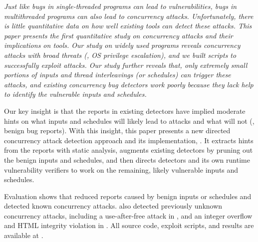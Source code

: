 \it Just like bugs in single-threaded programs can lead to vulnerabilities, 
bugs in multithreaded programs can also lead to concurrency attacks. 
Unfortunately, there is little quantitative data on how well existing tools 
can detect these attacks. This paper presents the first quantitative study 
on concurrency attacks and their implications on tools. Our study on 
\nprog widely used programs reveals \nattacks concurrency attacks with 
broad threats (\eg, OS privilege escalation), and we built scripts to 
successfully exploit \nreproduced attacks. Our study further reveals that, only 
extremely small portions of inputs and thread interleavings (or 
schedules) can trigger these attacks, and existing concurrency bug detectors 
work poorly because they lack help to identify the vulnerable inputs and 
schedules.



Our key insight is that the reports in existing detectors have implied 
moderate hints on what inputs and schedules will likely lead to attacks and 
what will not (\eg, benign bug reports). With this insight, this paper presents 
a new directed concurrency attack detection approach and its 
implementation, \xxx. It extracts hints from the reports with static 
analysis, augments existing detectors by pruning out the benign inputs and 
schedules, and then directs detectors and its own runtime vulnerability 
verifiers to work on the remaining, likely vulnerable inputs and schedules.

Evaluation shows that \xxx reduced \reducerate reports caused by benign inputs 
or schedules and detected \nknownVul known concurrency attacks. \xxx also 
detected \nunknownVul previously unknown concurrency attacks, including a 
use-after-free attack in \ssdb, and an integer overflow and HTML integrity 
violation in \apache. All \xxx source code, exploit scripts, and results 
are available at \github.

